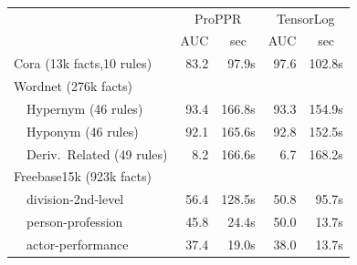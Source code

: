 \documentclass{article}
\newcommand{\cd}[1]{{\small \texttt{#1}}}
\begin{document}
\begin{table}
\begin{center}
\begin{minipage}[c]{0.3\linewidth}
\end{minipage}\\
~\\
~\\
\begin{tabular}{l|rr|rr} \hline
                      & \multicolumn{2}{c|}{ProPPR} & \multicolumn{2}{c}{TensorLog} \\
                      & \multicolumn{1}{c}{AUC} & \multicolumn{1}{c|}{sec} &
                                                  \multicolumn{1}{c}{AUC} & \multicolumn{1}{c}{sec} \\
\hline
Cora (13k facts,10 rules)
                      & 83.2     & 97.9s    & 97.6   & 102.8s \\
\hline
Wordnet (276k facts)  &          &          &        &          \\
~~Hypernym (46 rules) & 93.4     & 166.8s   & 93.3   & 154.9s   \\
~~Hyponym (46 rules)  & 92.1     & 165.6s   & 92.8   & 152.5s   \\
~~Deriv.~Related (49 rules)  
                      &  8.2     & 166.6s    & 6.7    & 168.2s  \\
\hline
Freebase15k (923k facts)   &          &          &        &     \\
~~division-2nd-level  &  56.4    & 128.5s   &  50.8  & 95.7s    \\
~~person-profession   &  45.8    & 24.4s    &  50.0  & 13.7s    \\
~~actor-performance   &  37.4    & 19.0s    &  38.0  & 13.7s    \\
\hline
\end{tabular}
\end{center}
\end{table}

\end{document}
